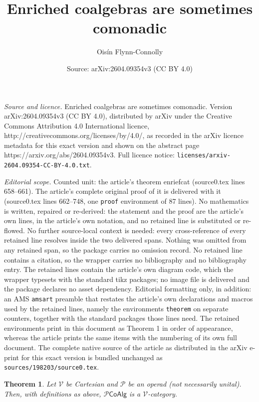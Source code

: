 \documentclass[10pt,a4paper]{amsart}
\title{Enriched coalgebras are sometimes comonadic}
\author{Ois\'in Flynn-Connolly}
\date{Source: arXiv:2604.09354v3 (CC BY 4.0)}
\newtheorem{theorem}{Theorem}
\def\P{\mathcal P}
\def\Pcoalg{\P\mathsf{CoAlg}}
\newcommand{\V}{\mathcal V}
\begin{document}
\maketitle

\noindent\emph{Source and licence.} Enriched coalgebras are sometimes comonadic. Version arXiv:2604.09354v3 (CC BY 4.0), distributed by arXiv under the Creative Commons Attribution 4.0 International licence, http://creativecommons.org/licenses/by/4.0/, as recorded in the arXiv licence metadata for this exact version and shown on the abstract page https://arxiv.org/abs/2604.09354v3. Full licence notice: \texttt{licenses/arxiv-2604.09354-CC-BY-4.0.txt}.\par\smallskip

\noindent\textit{Editorial scope.} Counted unit: the article's theorem enriefcat (source0.tex lines 658--661). The article's complete original proof of it is delivered with it (source0.tex lines 662--748, one \texttt{proof} environment of 87 lines). No mathematics is written, repaired or re-derived: the statement and the proof are the article's own lines, in the article's own notation, and no retained line is substituted or re-flowed.  No further source-local context is needed: every cross-reference of every retained line resolves inside the two delivered spans.  Nothing was omitted from any retained span, so the package carries no omission record.  No retained line contains a citation, so the wrapper carries no bibliography and no bibliography entry.  The retained lines contain the article's own diagram code, which the wrapper typesets with the standard tikz packages; no image file is delivered and the package declares no asset dependency.  Editorial formatting only, in addition: an AMS \texttt{amsart} preamble that restates the article's own declarations and macros used by the retained lines, namely the environments \texttt{theorem} on separate counters, together with the standard packages those lines need.  The retained environments print in this document as Theorem 1 in order of appearance, whereas the article prints the same items with the numbering of its own full document.  The complete native source of the article as distributed in the arXiv e-print for this exact version is bundled unchanged as \texttt{sources/198203/source0.tex}.
\begin{theorem}
\label{enriefcat}
    Let $\V$ be Cartesian and $\P$ be an operad (not necessarily unital). Then, with definitions as above, $\Pcoalg$ is a $\V$-category.
\end{theorem}
\end{document}
